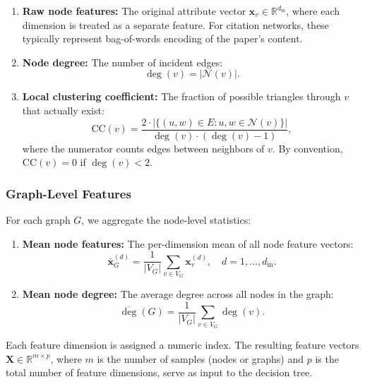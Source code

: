 \begin{enumerate}
  \item \textbf{Raw node features:} The original attribute vector $\mathbf{x}_v \in \mathbb{R}^{d_{\text{in}}}$, where each dimension is treated as a separate feature. For citation networks, these typically represent bag-of-words encoding of the paper's content.
  \item \textbf{Node degree:} The number of incident edges:
  \begin{equation}
  \deg(v) = |\mathcal{N}(v)|.
  \label{eq:degree}
  \end{equation}
  \item \textbf{Local clustering coefficient:} The fraction of possible triangles through $v$ that actually exist:
  \begin{equation}
  \text{CC}(v) = \frac{2 \cdot |\{ (u,w) \in E : u,w \in \mathcal{N}(v) \}|}{\deg(v) \cdot (\deg(v) - 1)},
  \label{eq:clustering}
  \end{equation}
  where the numerator counts edges between neighbors of $v$. By convention, $\text{CC}(v) = 0$ if $\deg(v) < 2$.
\end{enumerate}

\subsubsection{Graph-Level Features}

For each graph $G$, we aggregate the node-level statistics:

\begin{enumerate}
  \item \textbf{Mean node features:} The per-dimension mean of all node feature vectors:
  \begin{equation}
  \bar{\mathbf{x}}_G^{(d)} = \frac{1}{|V_G|} \sum_{v \in V_G} \mathbf{x}_v^{(d)}, \quad d = 1, \dots, d_{\text{in}}.
  \label{eq:mean_features}
  \end{equation}
  \item \textbf{Mean node degree:} The average degree across all nodes in the graph:
  \begin{equation}
  \overline{\deg}(G) = \frac{1}{|V_G|} \sum_{v \in V_G} \deg(v).
  \label{eq:mean_degree}
  \end{equation}
\end{enumerate}

Each feature dimension is assigned a numeric index. The resulting feature vectors $\mathbf{X} \in \mathbb{R}^{m \times p}$, where $m$ is the number of samples (nodes or graphs) and $p$ is the total number of feature dimensions, serve as input to the decision tree.

